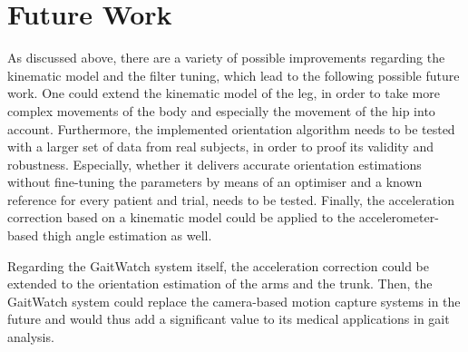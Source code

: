 \section{Future Work}

As discussed above, there are a variety of possible improvements regarding the kinematic model and the filter tuning, which lead to the following possible future work. One could extend the kinematic model of the leg, in order to take more complex movements of the body and especially the movement of the hip into account. Furthermore, the implemented orientation algorithm needs to be tested with a larger set of data from real subjects, in order to proof its validity and robustness. Especially, whether it delivers accurate orientation estimations without fine-tuning the parameters by means of an optimiser and a known reference for every patient and trial, needs to be tested. Finally, the acceleration correction based on a kinematic model could be applied to the accelerometer-based thigh angle estimation as well.

Regarding the GaitWatch system itself, the acceleration correction could be extended to the orientation estimation of the arms and the trunk. Then, the GaitWatch system could replace the camera-based motion capture systems in the future and would thus add a significant value to its medical applications in gait analysis.


